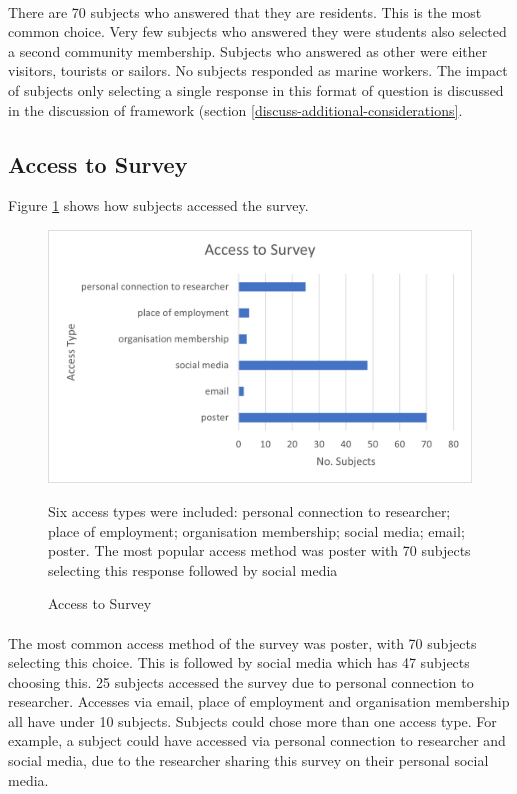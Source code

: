\paragraph{}

There are 70 subjects who answered that they are residents. This is the most common choice. Very few subjects who answered they were students also selected a second community membership. Subjects who answered as other were either visitors, tourists or sailors. No subjects responded as marine workers. The impact of subjects only selecting a single response in this format of question is discussed in the discussion of framework (section \ref{discuss-additional-considerations}. 


\subsection{Access to Survey}
Figure \ref{fig:survey_access} shows how subjects accessed the survey.  

\begin{figure}[H]
    \centering
    \includegraphics{fig_results/access_survey.png}
    \caption{Access to Survey}{ Six access types were included: personal connection to researcher; place of employment; organisation membership; social media; email; poster. The most popular access method was poster with 70 subjects selecting this response followed by social media}
    \label{fig:survey_access}
\end{figure}
\paragraph{}


The most common access method of the survey was poster, with 70 subjects selecting this choice. This is followed by social media which has 47 subjects choosing this. 25 subjects accessed the survey due to personal connection to researcher. Accesses via email, place of employment and organisation membership all have under 10 subjects. Subjects could chose more than one access type. For example, a subject could have accessed via personal connection to researcher and social media, due to the researcher sharing this survey on their personal social media.  

